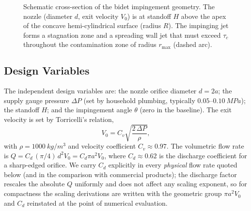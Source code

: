 \documentclass[aps,prfluids,reprint,amsmath,amssymb,floatfix]{revtex4-2}
\begin{document}
\begin{figure}[h]
\centering
{}
\caption{Schematic cross-section of the bidet impingement geometry.
The nozzle (diameter $d$, exit velocity $V_0$) is at standoff $H$ above
the apex of the concave hemi-cylindrical surface (radius $R$). The
impinging jet forms a stagnation zone and a spreading wall jet that
must exceed $\tau_c$ throughout the contamination zone of radius
$r_\mathrm{max}$ (dashed arc).}
\label{fig:geometry}
\end{figure}

\subsection{Design Variables}

The independent design variables are: the nozzle orifice diameter
$d = 2a$; the supply gauge pressure $\Delta P$ (set by household plumbing,
typically $0.05$--$\SI{0.10}{MPa}$); the standoff $H$; and the impingement
angle $\theta$ (zero in the baseline). The exit velocity is set by
Torricelli's relation,
\begin{equation}
  V_0 = C_v \sqrt{\frac{2\,\Delta P}{\rho}},
  \label{eq:torricelli}
\end{equation}
with $\rho = \SI{1000}{kg/m^3}$ and velocity coefficient $C_v \approx 0.97$.
The volumetric flow rate is $Q = C_d\,(\pi/4)\,d^2 V_0 = C_d \pi a^2 V_0$,
where $C_d \approx 0.62$ is the discharge coefficient for a sharp-edged
orifice. We carry $C_d$ explicitly in every \emph{physical} flow rate quoted
below (and in the comparison with commercial products); the discharge factor
rescales the absolute $Q$ uniformly and does not affect any scaling exponent,
so for compactness the scaling derivations are written with the geometric
group $\pi a^2 V_0$ and $C_d$ reinstated at the point of numerical evaluation.
\end{document}
